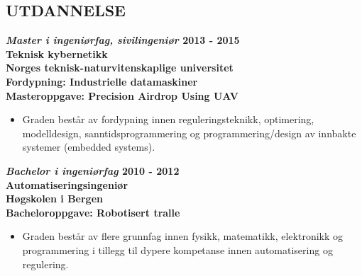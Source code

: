 \documentclass[margin, 10pt, norsk]{res} %
\begin{document}
\begin{resume}

 



\section{UTDANNELSE}

\textbf{\emph{Master i ingeniørfag, sivilingeniør} \hfill 2013 - 2015
\\Teknisk kybernetikk  \\
Norges teknisk-naturvitenskaplige universitet \\
Fordypning: Industrielle datamaskiner\\
Masteroppgave: Precision Airdrop Using UAV   } 
\begin{itemize} \itemsep -2pt %
\item Graden består av fordypning innen reguleringsteknikk, optimering, modelldesign, sanntidsprogrammering og programmering/design av innbakte systemer (embedded systems).
\end{itemize}

\textbf{\emph{Bachelor i ingeniørfag }\hfill 2010 - 2012\\
Automatiseringsingeniør \\
Høgskolen i Bergen \\
Bacheloroppgave: Robotisert tralle  } %
\begin{itemize} \itemsep -2pt %
\item Graden består av flere grunnfag innen fysikk, matematikk, elektronikk og programmering i tillegg til dypere kompetanse innen automatisering og regulering. 
\end{itemize}


\end{resume}
\end{document}
